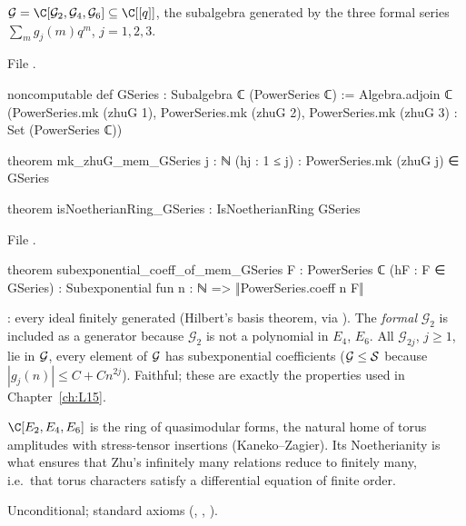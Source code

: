 \begin{definition}\label{l14:def:GSeries}
$\lfourteenGS = \C[\mathcal G_2,\mathcal G_4,\mathcal G_6]\subseteq\C[[q]]$, the subalgebra generated by the three formal
series $\sum_mg_j(m)q^m$, $j=1,2,3$.
\end{definition}
\noindent File .
\begin{leancode}
noncomputable def GSeries : Subalgebra ℂ (PowerSeries ℂ) :=
  Algebra.adjoin ℂ ({PowerSeries.mk (zhuG 1), PowerSeries.mk (zhuG 2),
    PowerSeries.mk (zhuG 3)} : Set (PowerSeries ℂ))

theorem mk_zhuG_mem_GSeries {j : ℕ} (hj : 1 ≤ j) :
    PowerSeries.mk (zhuG j) ∈ GSeries

theorem isNoetherianRing_GSeries : IsNoetherianRing GSeries
\end{leancode}
\noindent File .
\begin{leancode}
theorem subexponential_coeff_of_mem_GSeries {F : PowerSeries ℂ} (hF : F ∈ GSeries) :
    Subexponential fun n : ℕ => ‖PowerSeries.coeff n F‖
\end{leancode}
\begin{dictionary}
: every ideal finitely generated (Hilbert's basis theorem, via ). The
\emph{formal} $\mathcal G_2$ is included as a generator because $\mathcal G_2$ is not a polynomial in $E_4$, $E_6$. All
$\mathcal G_{2j}$, $j\ge1$, lie in $\mathcal{G}$, every element of $\mathcal{G}$ has subexponential coefficients
($\mathcal{G}\le\mathcal S$ because $|g_j(n)|\le C+Cn^{2j}$). Faithful; these are exactly the properties used in
Chapter~\ref{ch:L15}.
\end{dictionary}
\begin{physics}
$\C[E_2,E_4,E_6]$ is the ring of quasimodular forms, the natural home of torus amplitudes with stress-tensor insertions
(Kaneko--Zagier). Its Noetherianity is what ensures that Zhu's infinitely many relations reduce to finitely many, i.e.\ that
torus characters satisfy a differential equation of finite order.
\end{physics}
\begin{status}
Unconditional; standard axioms (, ,
).
\end{status}

